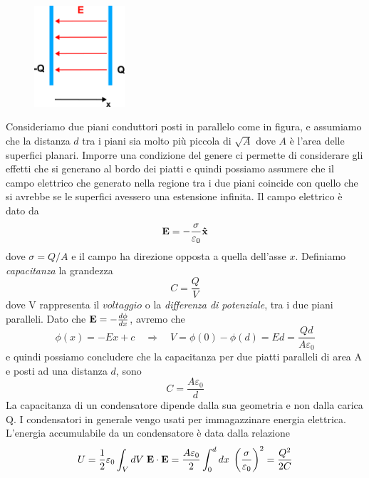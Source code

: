 \begin{figure} %
    \centering
    \includegraphics[width=0.3\textwidth]{images/parallelcapac} %
\end{figure}
Consideriamo due piani conduttori posti in parallelo come in figura, e assumiamo che la distanza $d$ tra i piani sia molto pi\`u piccola di $\sqrt{A}$ dove $A$ \`e l'area delle superfici planari. Imporre una condizione del genere ci permette di considerare gli effetti che si generano al bordo dei piatti e quindi possiamo assumere che il campo elettrico che generato nella regione tra i due piani coincide con quello che si avrebbe se le superfici avessero una estensione infinita. Il campo elettrico \`e dato da 
\begin{equation*}
	\bold{E} = -\frac{\sigma}{\varepsilon_0} \bold{\hat{x}}
\end{equation*}
dove $\sigma = Q/A$ e il campo ha direzione opposta a quella dell'asse $x$. Definiamo \textit{capacitanza} la grandezza 
\begin{equation}
	C = \frac{Q}{V}
\end{equation}
dove V rappresenta il $voltaggio$ o la \textit{differenza di potenziale}, tra i due piani paralleli. Dato che $\bold{E} = -\frac{d\phi}{dx}$, avremo che 
\begin{equation*}
	\phi(x) =-Ex+c \quad \Rightarrow \quad V = \phi(0) - \phi(d) = Ed = \frac{Qd}{A \varepsilon_0}
\end{equation*} 
e  quindi possiamo concludere che la capacitanza per due piatti paralleli di area A e posti ad una distanza $d$, sono
\begin{equation*}
	C = \frac{A \varepsilon_0}{d}
\end{equation*}
La capacitanza di un condensatore dipende dalla sua geometria e non dalla carica Q. I condensatori in generale vengo usati per immagazzinare energia elettrica. L'energia accumulabile da un condensatore \`e data dalla relazione 
\begin{equation*}
	U = \frac{1}{2} \varepsilon_0 \int_V dV \; \bold{E} \cdot \bold{E} = \frac{A \varepsilon_0}{2} \int_{0}^{d} dx \; \left ( \frac{\sigma}{\varepsilon_0}\right)^2 = \frac{Q^2}{2C}
\end{equation*}
